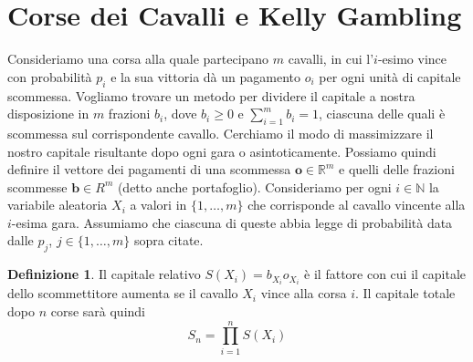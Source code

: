 \documentclass[a4paper,11pt]{book}
\theoremstyle{plain}
\theoremstyle{definition}
\newtheorem{defn}{Definizione}[chapter]
\theoremstyle{remark}
\newcommand{\R}{\mathbb{R}}
\newcommand{\N}{\mathbb{N}}
\begin{document}
\section{Corse dei Cavalli e Kelly Gambling}
Consideriamo una corsa alla quale partecipano $m$ cavalli, in cui l'$i$-esimo vince con probabilità $p_i$ e la sua vittoria dà un pagamento $o_i$ per ogni unità di capitale scommessa. Vogliamo trovare un metodo per dividere il capitale a nostra disposizione in $m$ frazioni $b_i$, dove $b_i\geq 0$ e $\sum_{i=1}^{m}{b_i} = 1$, ciascuna delle quali è scommessa sul corrispondente cavallo. Cerchiamo il modo di massimizzare il nostro capitale risultante dopo ogni gara o asintoticamente.\newline
Possiamo quindi definire il vettore dei pagamenti di una scommessa $\bm{o}\in \R^{m}$ e quelli delle frazioni scommesse $\bm{b}\in R^m$ (detto anche portafoglio). Consideriamo per ogni $i \in \N$ la variabile aleatoria $X_i$ a valori in $\{1, \ldots, m\}$ che corrisponde al cavallo vincente alla $i$-esima gara. Assumiamo che ciascuna di queste abbia legge di probabilità data dalle $p_j$, $j\in \{1,\ldots, m\}$ sopra citate.
\begin{defn}
	Il capitale relativo $S(X_i) = b_{X_i}o_{X_i}$ è il fattore con cui il capitale dello scommettitore aumenta se il cavallo $X_i$ vince alla corsa $i$. Il capitale totale dopo $n$ corse sarà quindi
	\begin{equation}
		S_n = \prod_{i = 1}^{n}{S(X_i)}
	\end{equation}
\end{defn}
\end{document}
